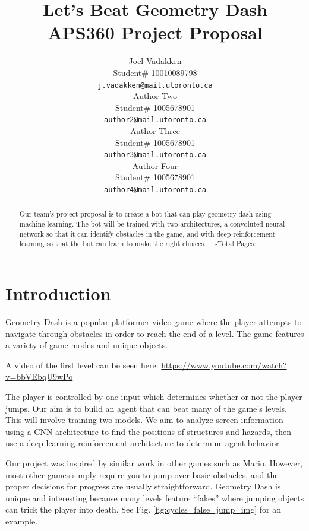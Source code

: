 \documentclass{article} %
\title{Let's Beat Geometry Dash  \\ 
APS360 Project Proposal}
\author{Joel Vadakken  \\
Student\# 10010089798\\
\texttt{j.vadakken@mail.utoronto.ca} \\
\And
Author Two  \\
Student\# 1005678901 \\
\texttt{author2@mail.utoronto.ca} \\
\AND
Author Three  \\
Student\# 1005678901 \\
\texttt{author3@mail.utoronto.ca} \\
\And
Author Four \\
Student\# 1005678901 \\
\texttt{author4@mail.utoronto.ca} \\
\AND
}
\begin{document}
\maketitle

\begin{abstract}
Our team's project proposal is to create a bot that can play 
geometry dash using machine learning. The bot will be trained
with two architectures, a convoluted neural network so that it
can identify obstacles in the game, and with deep reinforcement
learning so that the bot can learn to make the right choices.
----Total Pages: \pageref{last_page}
\end{abstract}



\section{Introduction}

Geometry Dash is a popular platformer video game 
where the player attempts to navigate through 
obstacles in order to reach the end of a level. 
The game features a variety of game modes and 
unique objects.

A video of the first level can be seen here:
\href{https://www.youtube.com/watch?v=bbVEbqU9wPo}{https://www.youtube.com/watch?v=bbVEbqU9wPo} 

The player is controlled by one input which 
determines whether or not the player jumps. 
Our aim is to build an agent that can beat many 
of the game’s levels. This will involve training 
two models. We aim to analyze screen information 
using a CNN architecture to find the positions 
of structures and hazards, then use a deep 
learning reinforcement architecture to determine 
agent behavior.

Our project was inspired by similar work in other
games such as Mario. However, most other games 
simply require you to jump over basic obstacles,
and the proper decisions for progress are usually 
straightforward. Geometry Dash is unique and 
interesting because many levels feature “fakes” 
where jumping objects can trick the player into death.
See Fig. \ref{fig:cycles_false_jump_img} for an example. 
\end{document}
